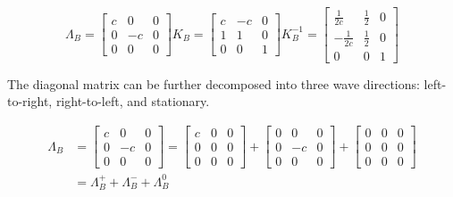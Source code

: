 \begin{equation}
    \Lambda_B = 
    \begin{bmatrix}
        c & 0 & 0 \\ 
        0 & -c & 0 \\ 
        0 & 0 & 0
    \end{bmatrix}
    K_B = 
    \begin{bmatrix}
        c & -c & 0 \\ 
        1 & 1 & 0 \\ 
        0 & 0 & 1 
    \end{bmatrix}
    K_B^{-1} = 
    \begin{bmatrix}
        \frac{1}{2c} & \frac{1}{2} & 0 \\ 
        -\frac{1}{2c} & \frac{1}{2} & 0 \\ 
        0 & 0 & 1
    \end{bmatrix}
\end{equation}

The diagonal matrix can be further decomposed into three wave directions: left-to-right,
right-to-left, and stationary.

\begin{equation}
	\begin{split}
		\Lambda_B & = 
        \begin{bmatrix}
            c & 0 & 0 \\ 
            0 & -c & 0 \\ 
            0 & 0 & 0
		\end{bmatrix} = 
		\begin{bmatrix}
            c & 0 & 0 \\ 
            0 & 0 & 0 \\ 
            0 & 0 & 0
		\end{bmatrix} +
		\begin{bmatrix}
            0 & 0 & 0 \\ 
            0 & -c & 0 \\ 
            0 & 0 & 0
		\end{bmatrix} +
		\begin{bmatrix}
            0 & 0 & 0 \\ 
            0 & 0 & 0 \\ 
            0 & 0 & 0
		\end{bmatrix} \\
		&= \Lambda_B^+ + \Lambda_B^- + \Lambda_B^0
	\end{split}
\end{equation}

